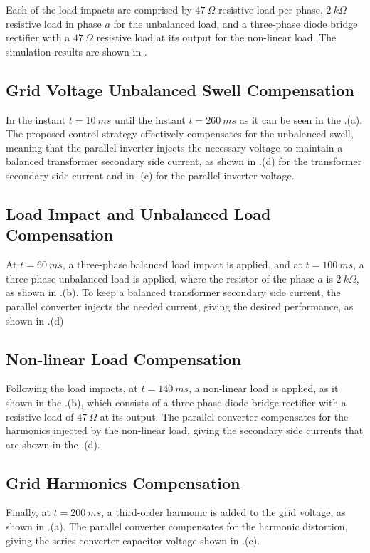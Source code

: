 Each of the load impacts are comprised by $47\ \Omega$ resistive load per phase, $2\ k\Omega$ resistive load in phase $a$ for the unbalanced load, and a three-phase diode bridge rectifier with a $47\ \Omega$ resistive load at its output for the non-linear load. The simulation results are shown in .

\subsection{Grid Voltage Unbalanced Swell Compensation}

In the instant $t=10\ ms$ until the instant $t = 260\ ms$ as it can be seen in the .(a). The proposed control strategy effectively compensates for the unbalanced swell, meaning that the parallel inverter injects the necessary voltage to maintain a balanced transformer secondary side current, as shown in .(d) for the transformer secondary side current and in .(c) for the parallel inverter voltage. 

\subsection{Load Impact and Unbalanced Load Compensation}

At $t=60\ ms$, a three-phase balanced load impact is applied, and at $t=100\ ms$, a three-phase unbalanced load is applied, where the resistor of the phase $a$ is $2\ k\Omega$, as shown in .(b). To keep a balanced transformer secondary side current, the parallel converter injects the needed current, giving the desired performance, as shown in .(d)

\subsection{Non-linear Load Compensation}

Following the load impacts, at $t=140\ ms$, a non-linear load is applied, as it shown in the .(b), which consists of a three-phase diode bridge rectifier with a resistive load of $47\ \Omega$ at its output. The parallel converter compensates for the harmonics injected by the non-linear load, giving the secondary side currents that are shown in the .(d).

\subsection{Grid Harmonics Compensation}

Finally, at $t=200\ ms$, a third-order harmonic is added to the grid voltage, as shown in .(a). The parallel converter compensates for the harmonic distortion, giving the series converter capacitor voltage shown in .(c).